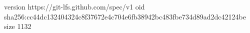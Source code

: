 version https://git-lfs.github.com/spec/v1
oid sha256:cc44dc132404324c8f37672e4c704e6fb38942bc483fbe734d89ad2dc42124be
size 1132
